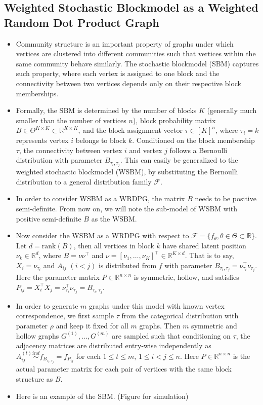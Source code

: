 \documentclass[a4paper]{article}
\begin{document}
\subsection{Weighted Stochastic Blockmodel as a Weighted Random Dot Product Graph}
\label{section:WSBM}
\begin{itemize}
\item Community structure is an important property of graphs under which vertices are clustered into different communities such that vertices within the same community behave similarly. The stochastic blockmodel (SBM) \cite{holland1983stochastic} captures such property, where each vertex is assigned to one block and the connectivity between two vertices depends only on their respective block memberships.
\item Formally, the SBM is determined by the number of blocks $K$ (generally much smaller than the number of vertices $n$), block probability matrix $B \in \Theta^{K \times K} \subset \mathbb{R}^{K \times K}$, and the block assignment vector $\tau \in [K]^n$, where $\tau_i = k$ represents vertex $i$ belongs to block $k$. Conditioned on the block membership $\tau$, the connectivity between vertex $i$ and vertex $j$ follows a Bernoulli distribution with parameter $B_{\tau_i, \tau_j}$. This can easily be generalized to the weighted stochastic blockmodel (WSBM), by substituting the Bernoulli distribution to a general distribution family $\mathcal{F}$.
\item In order to consider WSBM as a WRDPG, the matrix $B$ needs to be positive semi-definite. From now on, we will note the sub-model of WSBM with positive semi-definite $B$ as the WSBM.
\item Now consider the WSBM as a WRDPG with respect to $\mathcal{F} = \{ f_{\theta}, \theta \in \Theta \subset \mathbb{R} \}$. Let $d = 
\mathrm{rank}(B)$, then all vertices in block $k$ have shared latent position $\nu_k \in \mathbb{R}^{d}$, where $B = \nu \nu^{\top}$ and $\nu = [\nu_1, \dotsc, \nu_K]^{\top} \in \mathbb{R}^{K \times d}$. That is to say, $X_i = \nu_{\tau_i}$ and $A_{ij}$ $(i < j)$ is distributed from $f$ with parameter $B_{\tau_i, \tau_j} = \nu_{\tau_i}^{\top} \nu_{\tau_j}$. Here the parameter matrix $P \in \mathbb{R}^{n \times n}$ is symmetric, hollow, and satisfies $P_{ij} = X_i^{\top} X_j = \nu_{\tau_i}^{\top} \nu_{\tau_j} = B_{\tau_i, \tau_j}$.
\item In order to generate $m$ graphs under this model with known vertex correspondence, we first sample $\tau$ from the categorical distribution with parameter $\rho$ and keep it fixed for all $m$ graphs. Then $m$ symmetric and hollow graphs $G^{(1)}, \dotsc, G^{(m)}$ are sampled such that conditioning on $\tau$, the adjacency matrices are distributed entry-wise independently as $A^{(t)}_{ij} \stackrel{ind}{\sim} f_{B_{\tau_i, \tau_j}} = f_{P_{ij}}$ for each $1 \le t \le m$, $1 \le i < j \le n$. Here $P \in \mathbb{R}^{n \times n}$ is the actual parameter matrix for each pair of vertices with the same block structure as $B$.
\item Here is an example of the SBM. (Figure for simulation)
\end{itemize}
\end{document}
